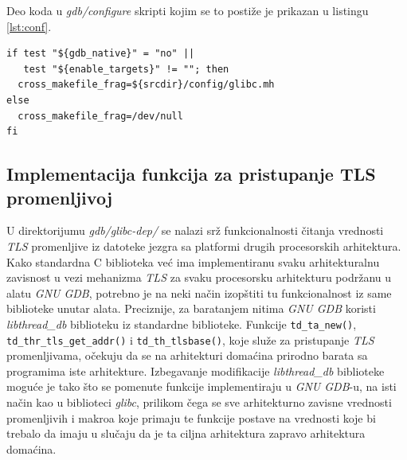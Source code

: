 \documentclass[12pt,oneside]{memoir}
\begin{document}
Deo koda u \emph{gdb/configure} skripti kojim se to postiže je prikazan u listingu \ref{lst:conf}.
\begin{lstlisting}[label={lst:conf}, caption={Izmena \emph{gdb/configure} fajla}]
if test "${gdb_native}" = "no" ||
   test "${enable_targets}" != ""; then
  cross_makefile_frag=${srcdir}/config/glibc.mh
else
  cross_makefile_frag=/dev/null
fi
\end{lstlisting}

\subsection{Implementacija funkcija za pristupanje TLS promenljivoj}

U direktorijumu \emph{gdb/glibc-dep/} se nalazi srž funkcionalnosti čitanja vrednosti \emph{TLS} promenljive iz datoteke jezgra sa platformi drugih procesorskih arhitektura. Kako standardna C biblioteka već ima implementiranu svaku arhitekturalnu zavisnost u vezi mehanizma \emph{TLS} za svaku procesorsku arhitekturu podržanu u alatu \emph{GNU GDB}, potrebno je na neki način izopštiti tu funkcionalnost iz same biblioteke unutar alata. Preciznije, za baratanjem nitima \emph{GNU GDB} koristi \emph{libthread\_db} biblioteku iz standardne biblioteke. Funkcije \texttt{td\_ta\_new()}, \texttt{td\_thr\_tls\_get\_addr()} i \texttt{td\_th\_tlsbase()}, koje služe za pristupanje \emph{TLS} promenljivama, očekuju da se na arhitekturi domaćina prirodno barata sa programima iste arhitekture. Izbegavanje modifikacije \emph{libthread\_db} biblioteke moguće je tako što se pomenute funkcije implementiraju u \emph{GNU GDB}-u, na isti način kao u biblioteci \emph{glibc}, prilikom čega se sve arhitekturno zavisne vrednosti promenljivih i makroa koje primaju te funkcije postave na vrednosti koje bi trebalo da imaju u slučaju da je ta ciljna arhitektura zapravo arhitektura domaćina.
\end{document}
